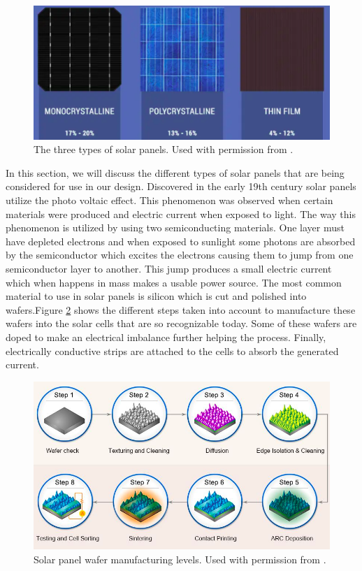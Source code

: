 \begin{figure}
    \centering
    \includegraphics[scale=0.4]{figures/solar panel overview.png}
    \caption{The three types of solar panels. Used with permission from \cite{solar-panels-ref}.}
    \label{solar-panel-overview} 
\end{figure}

In this section, we will discuss the different types of solar panels that are being considered for use in our design. Discovered in the early 19th century solar panels utilize the photo voltaic effect. This phenomenon was observed when certain materials were produced and electric current when exposed to light. The way this phenomenon is utilized by using two semiconducting materials. One layer must have depleted electrons and when exposed to sunlight some photons are absorbed by the semiconductor which excites the electrons causing them to jump from one semiconductor layer to another. This jump produces a small electric current which when happens in mass makes a usable power source. The most common material to use in solar panels is silicon which is cut and polished into wafers.Figure \ref{fig:solar cell} shows the different steps taken into account to manufacture these wafers into the solar cells that are so recognizable today. Some of these wafers are doped to make an electrical imbalance further helping the process. Finally, electrically conductive strips are attached to the cells to absorb the generated current. 
\begin{figure}
    \centering
    \includegraphics[scale=0.4]{figures/solar cell manu.png}
    \caption{Solar panel wafer manufacturing levels. Used with permission from \cite{solar-cell-ref}.}
    \label{fig:solar cell} 
\end{figure}

